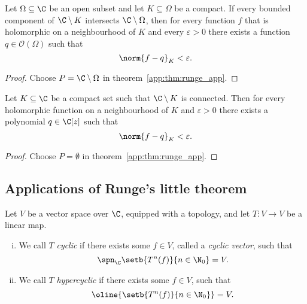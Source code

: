 \begin{izrek}
Let $\Omega \subseteq \C$ be an open subset and let
$K \subseteq \Omega$ be a compact. If every bounded component of
$\C \setminus K$ intersects $\C \setminus \Omega$, then for every
function $f$ that is holomorphic on a neighbourhood of $K$ and
every $\varepsilon > 0$ there exists a function
$q \in \mathcal{O}(\Omega)$ such that
\[
\norm{f - q}_K < \varepsilon.
\]
\end{izrek}

\begin{proof}
Choose $P = \C \setminus \Omega$ in
theorem~\ref{app:thm:runge_app}.
\end{proof}

\begin{posledica}
Let $K \subseteq \C$ be a compact set such that $\C \setminus K$ is
connected. Then for every holomorphic function on a neighbourhood
of $K$ and $\varepsilon > 0$ there exists a polynomial
$q \in \C[z]$ such that
\[
\norm{f - q}_K < \varepsilon.
\]
\end{posledica}

\begin{proof}
Choose $P = \emptyset$ in theorem~\ref{app:thm:runge_app}.
\end{proof}

\newpage

\subsection{Applications of Runge's little theorem}


\begin{definicija}
Let $V$ be a vector space over $\C$, equipped with a topology, and
let $T \colon V \to V$ be a linear map.

\begin{enumerate}[i)]
\item We call $T$ \emph{cyclic} if there exists
some $f \in V$, called a \emph{cyclic vector},
such that
\[
\spn_\C \setb{T^n(f)}{n \in \N_0} = V.
\]
\item We call $T$ \emph{hypercyclic} if
there exists some $f \in V$, such that
\[
\oline{\setb{T^n(f)}{n \in \N_0}} = V.
\]
\end{enumerate}
\end{definicija}

